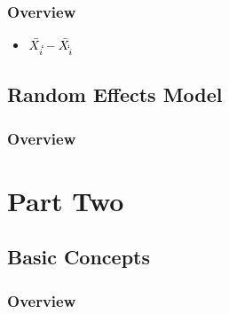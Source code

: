 \documentclass[11pt,fleqn]{book} %
\begin{document}
\section{Overview}

\begin{itemize}
	\item $\bar{X_{i\dot\dot}} - \bar{X_{\dot\dot i}}$
\end{itemize}




\chapter{Random Effects Model}

\section{Overview}




 \part{Part Two}



\chapter{Basic Concepts}

\section{Overview}


\end{document}
